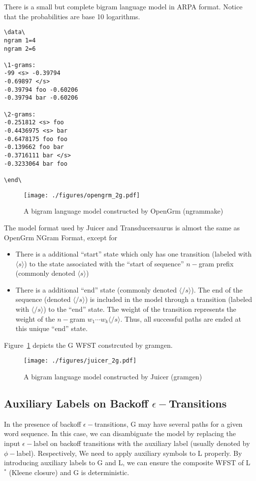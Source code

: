 \newpage
There is a small but complete bigram language model in ARPA format. Notice that the probabilities are base 10 logarithms.

\begin{Verbatim}[frame=none, framesep=5mm]
\data\
ngram 1=4
ngram 2=6

\1-grams:
-99 <s> -0.39794
-0.69897 </s>
-0.39794 foo -0.60206
-0.39794 bar -0.60206

\2-grams:
-0.251812 <s> foo
-0.4436975 <s> bar
-0.6478175 foo foo
-0.139662 foo bar
-0.3716111 bar </s>
-0.3233064 bar foo

\end\
\end{Verbatim}

\begin{figure}[H]
  \centering
  \texttt{[image: ./figures/opengrm\_2g.pdf]}
  \caption{A bigram language model constructed by OpenGrm (ngrammake)}
\end{figure}

The model format used by Juicer and Transducersaurus is almost the same as OpenGrm NGram Format, except for

\begin{itemize}
\item
  There is a additional ``start'' state which only has one transition (labeled with $\langle s\rangle$) to the state associated with the ``start of sequence'' $n-$gram prefix (commonly denoted $\langle s\rangle$)
\item
  There is a additional ``end'' state (commonly denoted $\langle /s\rangle$). The end of the sequence (denoted $\langle /s\rangle$) is included in the model through a transition (labeled with $\langle /s\rangle$) to the ``end'' state. The weight of the transition represents the weight of the $n-$gram $w_1\cdots{}w_k \langle /s\rangle$. Thus, all successful paths are ended at this unique ``end'' state.
\end{itemize}

Figure~\ref{gramgen} depicts the G WFST constrcuted by gramgen.

\begin{figure}[H]
  \centering
  \texttt{[image: ./figures/juicer\_2g.pdf]}
  \caption{A bigram language model constructed by Juicer (gramgen)}
  \label{gramgen}
\end{figure}

\subsection{Auxiliary Labels on Backoff $\epsilon-$Transitions}
\label{subsubsec:grmaux}
In the presence of backoff $\epsilon-$transitions, G may have several paths for a given word sequence. In this case, we can disambiguate the model by replacing the input $\epsilon-$label on backoff transitions with the auxiliary label (usually denoted by $\phi-$label). Respectively, We need to apply auxiliary symbols to L properly. By introducing auxiliary labels to G and L, we can ensure the composite WFST of L$^{*}$ (Kleene closure) and G is deterministic.

